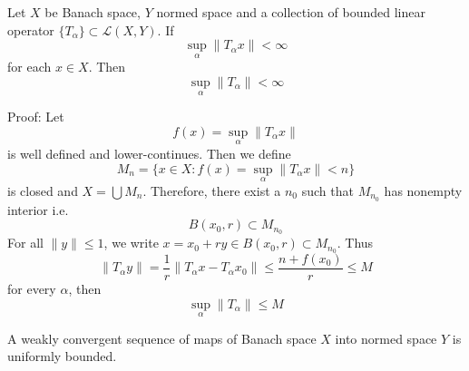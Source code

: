 \documentclass[12pt, oneside]{book}
\begin{document}
\begin{theorem}
    Let $X$ be Banach space, $Y$ normed space and a collection of bounded linear operator $\{T_\alpha\}\subset \mathcal{L} (X,Y)$.
    If
    \begin{equation*}
        \sup_\alpha \|T_\alpha x\|
        <
        \infty
    \end{equation*}
    for each $x\in X$. Then
    \begin{equation*}
        \sup_\alpha
        \|T_\alpha\|
        <
        \infty
    \end{equation*}

    Proof:
    Let
    \begin{equation*}
        f(x)
        =
        \sup_\alpha \|T_\alpha x\|
    \end{equation*}
    is well defined and lower-continues.
    Then we define
    \begin{equation*}
        M_n
        =
        \{x\in X : f(x)=\sup_\alpha \|T_\alpha x\| <n\}
    \end{equation*}
    is closed and $X=\bigcup M_n$. Therefore, there exist a $n_0$ such that $M_{n_0}$ has nonempty interior i.e.
    \begin{equation*}
        B(x_0,r)
        \subset
        M_{n_0}
    \end{equation*}
    For all $\|y\|\leq 1$, we write $x= x_0 + ry \in B(x_0,r)
        \subset M_{n_0}$. Thus
    \begin{equation*}
        \|T_\alpha y \|
        =
        \frac{1}{r}  \|T_\alpha x -T_\alpha x_0 \|
        \leq
        \frac{n+f(x_0) }{r}
        \leq
        M
    \end{equation*}
    for every $\alpha$, then
    \begin{equation*}
        \sup_\alpha \|T_\alpha\|
        \leq
        M
    \end{equation*}
\end{theorem}

\begin{corollary}
    A weakly convergent sequence of maps of Banach space $X$ into normed space $Y$ is uniformly bounded.
\end{corollary}
\end{document}
